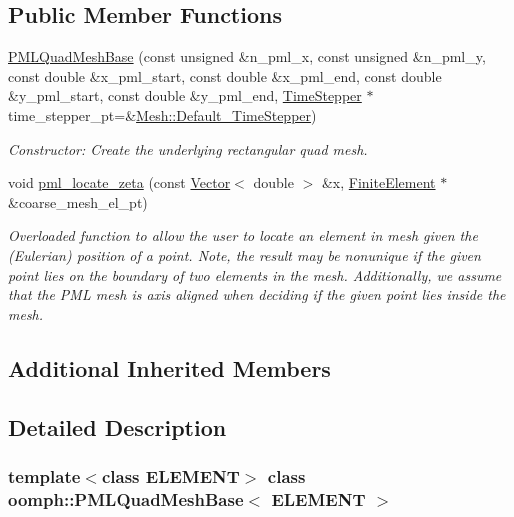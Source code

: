 \subsection*{Public Member Functions}
\begin{DoxyCompactItemize}
\item 
\hyperlink{classoomph_1_1PMLQuadMeshBase_aff4042f75a253b56f06cb321605c2afe}{P\+M\+L\+Quad\+Mesh\+Base} (const unsigned \&n\+\_\+pml\+\_\+x, const unsigned \&n\+\_\+pml\+\_\+y, const double \&x\+\_\+pml\+\_\+start, const double \&x\+\_\+pml\+\_\+end, const double \&y\+\_\+pml\+\_\+start, const double \&y\+\_\+pml\+\_\+end, \hyperlink{classoomph_1_1TimeStepper}{Time\+Stepper} $\ast$time\+\_\+stepper\+\_\+pt=\&\hyperlink{classoomph_1_1Mesh_a12243d0fee2b1fcee729ee5a4777ea10}{Mesh\+::\+Default\+\_\+\+Time\+Stepper})
\begin{DoxyCompactList}\small\item\em Constructor\+: Create the underlying rectangular quad mesh. \end{DoxyCompactList}\item 
void \hyperlink{classoomph_1_1PMLQuadMeshBase_a8054b13b65a898e1364ca30eace6c1e8}{pml\+\_\+locate\+\_\+zeta} (const \hyperlink{classoomph_1_1Vector}{Vector}$<$ double $>$ \&x, \hyperlink{classoomph_1_1FiniteElement}{Finite\+Element} $\ast$\&coarse\+\_\+mesh\+\_\+el\+\_\+pt)
\begin{DoxyCompactList}\small\item\em Overloaded function to allow the user to locate an element in mesh given the (Eulerian) position of a point. Note, the result may be nonunique if the given point lies on the boundary of two elements in the mesh. Additionally, we assume that the P\+ML mesh is axis aligned when deciding if the given point lies inside the mesh. \end{DoxyCompactList}\end{DoxyCompactItemize}
\subsection*{Additional Inherited Members}


\subsection{Detailed Description}
\subsubsection*{template$<$class E\+L\+E\+M\+E\+NT$>$\newline
class oomph\+::\+P\+M\+L\+Quad\+Mesh\+Base$<$ E\+L\+E\+M\+E\+N\+T $>$}

